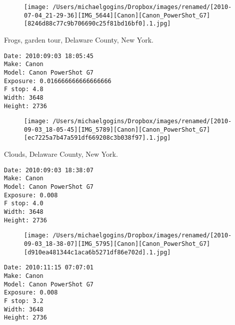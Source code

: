\documentclass[11pt,letter,DIV=14,paper=landscape]{scrbook}
\begin{document}
\begin{figure}
\texttt{[image: /Users/michaelgogins/Dropbox/images/renamed/[2010-07-04\_21-29-36][IMG\_5644][Canon][Canon\_PowerShot\_G7][8246d88c77c9b706690c25f81bd16bf0].1.jpg]}
\end{figure}
    
\clearpage
\noindent Frogs, garden tour, Delaware County, New York.
\noindent
\begin{lstlisting}
Date: 2010:09:03 18:05:45
Make: Canon
Model: Canon PowerShot G7
Exposure: 0.016666666666666666
F stop: 4.8
Width: 3648
Height: 2736
\end{lstlisting}
\clearpage

\begin{figure}
\texttt{[image: /Users/michaelgogins/Dropbox/images/renamed/[2010-09-03\_18-05-45][IMG\_5789][Canon][Canon\_PowerShot\_G7][ec7225a7b47a591df669208c3b038f97].1.jpg]}
\end{figure}
    
\clearpage
\noindent Clouds, Delaware County, New York.
\noindent
\begin{lstlisting}
Date: 2010:09:03 18:38:07
Make: Canon
Model: Canon PowerShot G7
Exposure: 0.008
F stop: 4.0
Width: 3648
Height: 2736
\end{lstlisting}
\clearpage

\begin{figure}
\texttt{[image: /Users/michaelgogins/Dropbox/images/renamed/[2010-09-03\_18-38-07][IMG\_5795][Canon][Canon\_PowerShot\_G7][d910ea481344c1aca6b5271df86e702d].1.jpg]}
\end{figure}
    
\clearpage
\noindent 
\noindent
\begin{lstlisting}
Date: 2010:11:15 07:07:01
Make: Canon
Model: Canon PowerShot G7
Exposure: 0.008
F stop: 3.2
Width: 3648
Height: 2736
\end{lstlisting}
\clearpage
\end{document}
